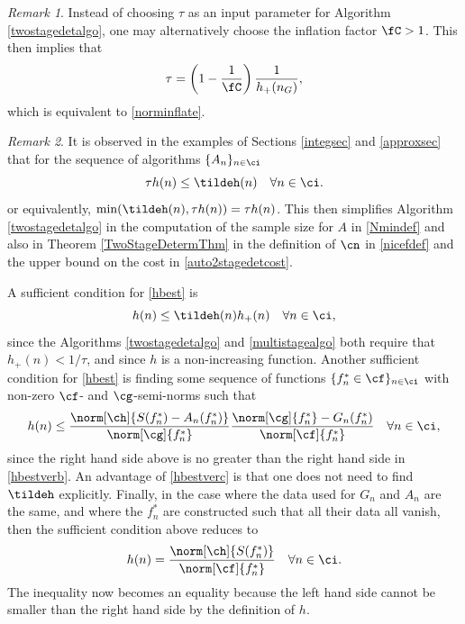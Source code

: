\documentclass[]{elsarticle}
\theoremstyle{definition}
\theoremstyle{remark}
\newtheorem{rem}{Remark}
\begin{document}
\begin{rem} Instead of choosing $\tau$ as an input parameter for Algorithm \ref{twostagedetalgo}, one may alternatively choose the inflation factor $\fC >1$.  This then implies that 
\begin{equation} \label{taufromnC}
\tau = \left(1 - \frac{1}{\fC}\right)\frac{1}{h_{+}(n_G)},
\end{equation}
which is equivalent to \eqref{norminflate}.
\end{rem}

\begin{rem} It is observed in the examples of Sections \ref{integsec} and \ref{approxsec} that for the sequence of algorithms $\{A_n\}_{n \in \ci}$
\begin{equation} \label{hbest}
\tau h(n) \le \tildeh(n) \quad \forall n \in \ci.
\end{equation}
or equivalently, $\min(\tildeh(n),\tau h(n))=\tau h(n)$.  This then simplifies Algorithm \ref{twostagedetalgo} in the computation of the sample size for $A$ in \eqref{Nmindef} and also in Theorem \ref{TwoStageDetermThm} in the definition of $\cn$ in \eqref{nicefdef} and the upper bound on the cost in \eqref{auto2stagedetcost}. 

A sufficient condition for \eqref{hbest} is
\begin{equation} \label{hbestverb}
h(n) \le \tildeh(n) h_{+}(n) \quad \forall n \in \ci,
\end{equation}
since the Algorithms \ref{twostagedetalgo} and \ref{multistagealgo} both require that $h_{+}(n) < 1/\tau$, and since $h$ is a non-increasing function.   Another 
sufficient condition for \eqref{hbest} is finding some sequence of functions $\{f^*_n \in \cf\}_{n \in \ci}$ with non-zero $\cf$- and $\cg$-semi-norms such that 
\begin{equation} \label{hbestverc}
h(n) \le \frac{\norm[\ch]{S(f^*_n)-A_n(f_n^*)}}{\norm[\cg]{f_n^*}} \frac{\norm[\cg]{f^*_n}-G_n(f^*_n)}{\norm[\cf]{f^*_n}}   \quad \forall n \in \ci,
\end{equation}
since the right hand side above is no greater than the right hand side in \eqref{hbestverb}. An advantage of \eqref{hbestverc} is that one does not need to find $\tildeh$ explicitly. Finally, in the case where the data used for $G_n$ and $A_n$ are the same, and where the $f^*_n$ are constructed such that all their data all vanish, then the sufficient condition above reduces to 
\begin{equation} \label{hbestverd}
h(n) = \frac{\norm[\ch]{S(f^*_n)}}{\norm[\cf]{f^*_n}}   \quad \forall n \in \ci.
\end{equation}
The inequality now becomes an equality because the left hand side cannot be smaller than the right hand side by the definition of $h$.
\end{rem}
\end{document}
